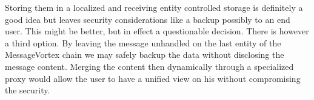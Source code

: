 Storing them in a localized and receiving entity controlled storage is definitely a good idea but leaves security considerations like a backup possibly to an end user. This might be better, but in effect a questionable decision. There is however a third option. By leaving the message unhandled on the last entity of the MessageVortex chain we may safely backup the data without disclosing the message content. Merging the content then dynamically through a specialized proxy would allow the user to have a unified view on his without compromising the security.


